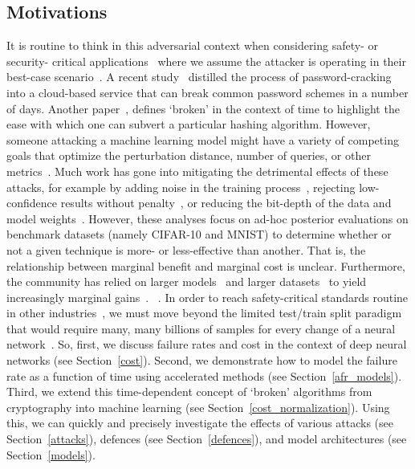 \subsection{Motivations}
It is routine to think in this adversarial context when considering safety- or security- critical applications~\cite{ai_medical_imaging,ai_security,ai_prison,ai_aviation,ai_luggage} where we assume the attacker is operating in their best-case scenario~\cite{leurent2020sha,kamal2017study,madry2017towards,pixelattack,deepfool,croce_reliable_2020}. A recent study~\cite{kamal2017study} distilled the process of password-cracking into a cloud-based service that can break common password schemes in a number of days. Another paper~\cite{leurent2020sha}, defines `broken' in the context of time to highlight the ease with which one can subvert a particular hashing algorithm. However, someone attacking a machine learning model might have a variety of competing goals that optimize the perturbation distance, number of queries, or other metrics~\cite{madry2017towards,hopskipjump,pixelattack,fgm,deepfool}. Much work has gone into mitigating the detrimental effects of these attacks, for example by adding noise in the training process~\cite{gauss_aug,gauss_out}, rejecting low-confidence results without penalty~\cite{high_conf}, or reducing the bit-depth of the data and model weights~\cite{feature_squeezing}. However, these analyses focus on ad-hoc posterior evaluations on benchmark datasets (namely CIFAR-10 and MNIST) to determine whether or not a given technique is more- or less-effective than another. That is, the relationship between marginal benefit and marginal cost is unclear. Furthermore, the community has relied on larger models~\cite{desislavov2021compute} and larger datasets~\cite{desislavov2021compute,bailly2022effects} to yield increasingly marginal gains~\cite{sun2017revisiting}. ~. In order to reach safety-critical standards routine in other industries~\cite{iso26262,IEC61508,IEC62034}, we must move beyond the limited test/train split paradigm that would require many, many billions of samples for every change of a neural network~\cite{meyers}. So, first, we discuss failure rates and cost in the context of deep neural networks (see Section~\ref{cost}). Second, we demonstrate how to model the failure rate as a function of time  using accelerated methods (see Section~\ref{afr_models}). Third, we extend this time-dependent concept of `broken' algorithms from cryptography into machine learning (see Section~\ref{cost_normalization}). Using this, we can quickly and precisely investigate the effects of various attacks (see Section~\ref{attacks}), defences (see Section~\ref{defences}), and model architectures (see Section~\ref{models}).


